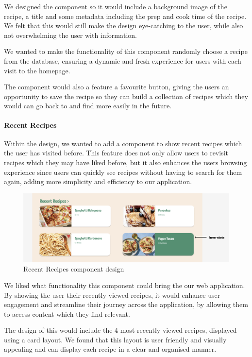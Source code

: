 \documentclass{article}
\begin{document}
We designed the component so it would include a background image of the recipe, a title and some metadata including the prep and cook time of the recipe. We felt that this would still make the design eye-catching to the user, while also not overwhelming the user with information.

We wanted to make the functionality of this component randomly choose a recipe from the database, ensuring a dynamic and fresh experience for users with each visit to the homepage.

The component would also a feature a favourite button, giving the users an opportunity to save the recipe so they can build a collection of recipes which they would can go back to and find more easily in the future. 

\paragraph{Recent Recipes}  
Within the design, we wanted to add a component to show recent recipes which the user has visited before. This feature does not only allow users to revisit recipes which they may have liked before, but it also enhances the users browsing experience since users can quickly see recipes without having to search for them again, adding more simplicity and efficiency to our application.

\begin{figure}[h]
  \includegraphics[width=1.0\textwidth]{assets/design-images/Version 1 Recent Recipes.png}
  \centering
  \caption{Recent Recipes component design}
\end{figure}

We liked what functionality this component could bring the our web application. By showing the user their recently viewed recipes, it would enhance user engagement and streamline their journey across the application, by allowing them to access content which they find relevant.

The design of this would include the 4 most recently viewed recipes, displayed using a card layout. We found that this layout is user friendly and visually appealing and can display each recipe in a clear and organised manner. 
\end{document}
